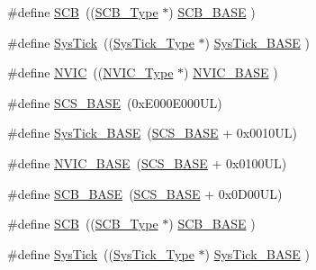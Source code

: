 \begin{DoxyCompactItemize}
\item 
\#define \mbox{\hyperlink{group___c_m_s_i_s__core__base_gaaaf6477c2bde2f00f99e3c2fd1060b01}{S\+CB}}~((\mbox{\hyperlink{struct_s_c_b___type}{S\+C\+B\+\_\+\+Type}}       $\ast$)     \mbox{\hyperlink{group___c_m_s_i_s__core__base_gad55a7ddb8d4b2398b0c1cfec76c0d9fd}{S\+C\+B\+\_\+\+B\+A\+SE}}      )
\item 
\#define \mbox{\hyperlink{group___c_m_s_i_s__core__base_gacd96c53beeaff8f603fcda425eb295de}{Sys\+Tick}}~((\mbox{\hyperlink{struct_sys_tick___type}{Sys\+Tick\+\_\+\+Type}}   $\ast$)     \mbox{\hyperlink{group___c_m_s_i_s__core__base_ga58effaac0b93006b756d33209e814646}{Sys\+Tick\+\_\+\+B\+A\+SE}}  )
\item 
\#define \mbox{\hyperlink{group___c_m_s_i_s__core__base_gac8e97e8ce56ae9f57da1363a937f8a17}{N\+V\+IC}}~((\mbox{\hyperlink{struct_n_v_i_c___type}{N\+V\+I\+C\+\_\+\+Type}}      $\ast$)     \mbox{\hyperlink{group___c_m_s_i_s__core__base_gaa0288691785a5f868238e0468b39523d}{N\+V\+I\+C\+\_\+\+B\+A\+SE}}     )
\item 
\#define \mbox{\hyperlink{group___c_m_s_i_s__core__base_ga3c14ed93192c8d9143322bbf77ebf770}{S\+C\+S\+\_\+\+B\+A\+SE}}~(0x\+E000\+E000\+U\+L)
\item 
\#define \mbox{\hyperlink{group___c_m_s_i_s__core__base_ga58effaac0b93006b756d33209e814646}{Sys\+Tick\+\_\+\+B\+A\+SE}}~(\mbox{\hyperlink{group___c_m_s_i_s__core__base_ga3c14ed93192c8d9143322bbf77ebf770}{S\+C\+S\+\_\+\+B\+A\+SE}} +  0x0010\+U\+L)
\item 
\#define \mbox{\hyperlink{group___c_m_s_i_s__core__base_gaa0288691785a5f868238e0468b39523d}{N\+V\+I\+C\+\_\+\+B\+A\+SE}}~(\mbox{\hyperlink{group___c_m_s_i_s__core__base_ga3c14ed93192c8d9143322bbf77ebf770}{S\+C\+S\+\_\+\+B\+A\+SE}} +  0x0100\+U\+L)
\item 
\#define \mbox{\hyperlink{group___c_m_s_i_s__core__base_gad55a7ddb8d4b2398b0c1cfec76c0d9fd}{S\+C\+B\+\_\+\+B\+A\+SE}}~(\mbox{\hyperlink{group___c_m_s_i_s__core__base_ga3c14ed93192c8d9143322bbf77ebf770}{S\+C\+S\+\_\+\+B\+A\+SE}} +  0x0\+D00\+U\+L)
\item 
\#define \mbox{\hyperlink{group___c_m_s_i_s__core__base_gaaaf6477c2bde2f00f99e3c2fd1060b01}{S\+CB}}~((\mbox{\hyperlink{struct_s_c_b___type}{S\+C\+B\+\_\+\+Type}}       $\ast$)     \mbox{\hyperlink{group___c_m_s_i_s__core__base_gad55a7ddb8d4b2398b0c1cfec76c0d9fd}{S\+C\+B\+\_\+\+B\+A\+SE}}      )
\item 
\#define \mbox{\hyperlink{group___c_m_s_i_s__core__base_gacd96c53beeaff8f603fcda425eb295de}{Sys\+Tick}}~((\mbox{\hyperlink{struct_sys_tick___type}{Sys\+Tick\+\_\+\+Type}}   $\ast$)     \mbox{\hyperlink{group___c_m_s_i_s__core__base_ga58effaac0b93006b756d33209e814646}{Sys\+Tick\+\_\+\+B\+A\+SE}}  )

\end{DoxyCompactItemize}
